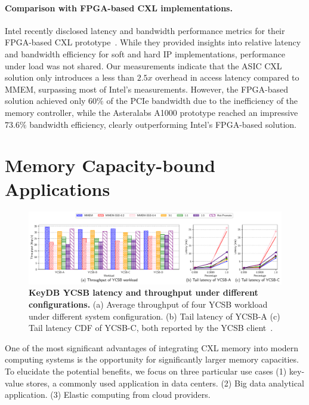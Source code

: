 \paragraph{Comparison with FPGA-based CXL implementations.}
Intel recently disclosed latency and bandwidth performance metrics for their FPGA-based CXL prototype~\cite{demystify}. While they provided insights into relative latency and bandwidth efficiency for soft and hard IP implementations, performance under load was not shared. Our measurements indicate that the ASIC CXL solution only introduces a less than $2.5x$ overhead in access latency compared to MMEM, surpassing most of Intel's measurements. However, the FPGA-based solution achieved only $60\%$ of the PCIe bandwidth due to the inefficiency of the memory controller, while the Asteralabs A1000 prototype reached an impressive $73.6\%$ bandwidth efficiency, clearly outperforming Intel's FPGA-based solution.


\section{Memory Capacity-bound Applications}
\label{sec:capacity}


\begin{figure}[t]
\centering
  \includegraphics[width=1\textwidth]{fig/cxl/redis_ycsb_cxl.pdf}
  \caption{\textbf{KeyDB YCSB latency and throughput under different configurations.} (a) Average throughput of four YCSB workload under different system configuration. (b) Tail latency of YCSB-A (c) Tail latency CDF of YCSB-C, both reported by the YCSB client~\cite{YCSB}.}
  \label{fig:ycsb_cxl}
\end{figure}

One of the most significant advantages of integrating CXL memory into modern computing systems is the opportunity for significantly larger memory capacities. To elucidate the potential benefits, we focus on three particular use cases (1) key-value stores, a commonly used application in data centers. (2) Big data analytical application. (3) Elastic computing from cloud providers.

